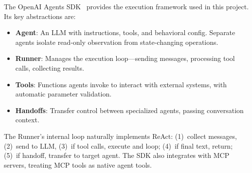 The OpenAI Agents SDK~\cite{openaiagentssdk2024} provides the execution framework used in this project. Its key abstractions are:

\begin{itemize}
    \item \textbf{Agent}: An LLM with instructions, tools, and behavioral config. Separate agents isolate read-only observation from state-changing operations.
    \item \textbf{Runner}: Manages the execution loop—sending messages, processing tool calls, collecting results.
    \item \textbf{Tools}: Functions agents invoke to interact with external systems, with automatic parameter validation.
    \item \textbf{Handoffs}: Transfer control between specialized agents, passing conversation context.
\end{itemize}

The Runner's internal loop naturally implements ReAct: (1)~collect messages, (2)~send to LLM, (3)~if tool calls, execute and loop; (4)~if final text, return; (5)~if handoff, transfer to target agent. The SDK also integrates with MCP servers, treating MCP tools as native agent tools.
